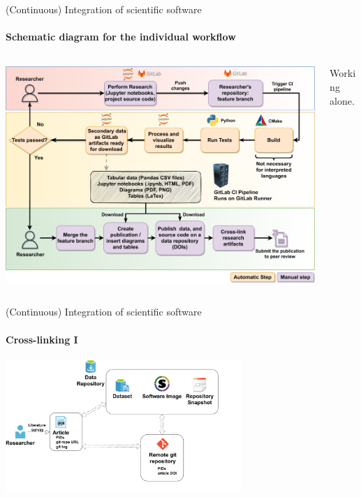 \begin{frame}{(Continuous) Integration of scientific software} 
	\framesubtitle{Schematic diagram for the individual workflow}
        \vfill

        \centering

        \begin{columns}
            \begin{column}[c]{0.55\textwidth}
                \includegraphics[width=\columnwidth]{figures/ZINF-CI-diagram-individual.pdf}
            \end{column}
            \begin{column}[c]{0.20\textwidth}
                Working alone. 
            \end{column}
        \end{columns}
\end{frame}

\begin{frame}{(Continuous) Integration of scientific software} 
\framesubtitle{Cross-linking I}
\vfill

    \begin{center}
            \includegraphics[width=0.67\textwidth]{figures/cross-linking.pdf}
    \end{center}

\end{frame}

